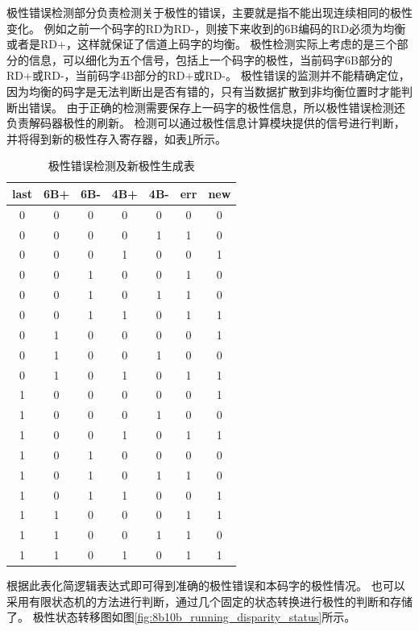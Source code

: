 \documentclass[UTF8]{ctexart}
\begin{document}
极性错误检测部分负责检测关于极性的错误，主要就是指不能出现连续相同的极性变化。
例如之前一个码字的RD为RD-，则接下来收到的6B编码的RD必须为均衡或者是RD+，这样就保证了信道上码字的均衡。
极性检测实际上考虑的是三个部分的信息，可以细化为五个信号，包括上一个码字的极性，当前码字6B部分的RD+或RD-，当前码字4B部分的RD+或RD-。
极性错误的监测并不能精确定位，因为均衡的码字是无法判断出是否有错的，只有当数据扩散到非均衡位置时才能判断出错误。
由于正确的检测需要保存上一码字的极性信息，所以极性错误检测还负责解码器极性的刷新。
检测可以通过极性信息计算模块提供的信号进行判断，并将得到新的极性存入寄存器，如表\ref{tab:tab_RD_err}所示。

\begin{table}[H]
\centering
\caption{极性错误检测及新极性生成表}
\label{tab:tab_RD_err}
\begin{tabular}{|c|c|c|c|c|c|c|}
\hline
	last	&	6B+	&	6B-	&	4B+	&	4B-	&	err	&	new	\\
\hline
	0 	 	&	0 	&	0 	& 	0	&	0 	&	0 	&	0 	\\
	0 	 	&	0 	&	0 	& 	0	&	1 	&	1 	&	0 	\\
	0 	 	&	0 	&	0 	& 	1	&	0 	&	0 	&	1 	\\
	0 	 	&	0 	&	1 	& 	0	&	0 	&	1 	&	0 	\\
	0 	 	&	0 	&	1 	& 	0	&	1 	&	1 	&	0 	\\
	0 	 	&	0 	&	1 	& 	1	&	0 	&	1 	&	1 	\\
	0 	 	&	1 	&	0 	& 	0	&	0 	&	0 	&	1 	\\
	0 	 	&	1 	&	0 	& 	0	&	1 	&	0 	&	0 	\\
	0 	 	&	1 	&	0 	& 	1	&	0 	&	1 	&	1 	\\
	1 	 	&	0 	&	0 	& 	0	&	0 	&	0 	&	1 	\\
	1 	 	&	0 	&	0 	& 	0	&	1 	&	0 	&	0 	\\
	1 	 	&	0 	&	0 	& 	1	&	0 	&	1 	&	1 	\\
	1 	 	&	0 	&	1 	& 	0	&	0 	&	0 	&	0 	\\
	1 	 	&	0 	&	1 	& 	0	&	1 	&	1 	&	0 	\\
	1 	 	&	0 	&	1 	& 	1	&	0 	&	0 	&	1 	\\
	1 	 	&	1 	&	0 	& 	0	&	0 	&	1 	&	1 	\\
	1 	 	&	1 	&	0 	& 	0	&	1 	&	1 	&	0 	\\
	1 	 	&	1 	&	0 	& 	1	&	0 	&	1 	&	1 	\\
\hline
\end{tabular}
\end{table}

根据此表化简逻辑表达式即可得到准确的极性错误和本码字的极性情况。
也可以采用有限状态机的方法进行判断，通过几个固定的状态转换进行极性的判断和存储了\cite{AlKafi2013}。
极性状态转移图如图\ref{fig:8b10b_running_disparity_status}所示。
\end{document}
